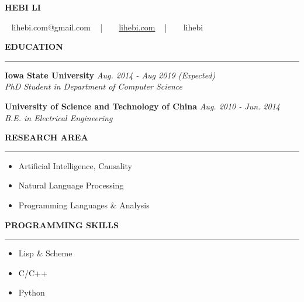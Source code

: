 \documentclass[10pt,letterpaper]{article}
\newenvironment{mysection}[1]{ %
  \medskip
  \MakeUppercase{\bf #1}
  \medskip
  \hrule
  \medskip
  \begin{list}{}{
      \setlength{\leftmargin}{1.5em}
    }
  \item[]
}{
  \end{list}
}
\begin{document}
\centerline{\MakeUppercase{\huge\bf Hebi Li}}
\medskip
\centerline{\faEnvelope ~ lihebi.com@gmail.com ~ | ~ \faHome ~
  \href{http://lihebi.com}{lihebi.com} ~ | ~ \faGithubSquare ~ lihebi
}

\begin{mysection}{Education}
  \textbf{Iowa State University} \hfill \emph{Aug. 2014 - Aug 2019 (Expected)} \\
  \emph{PhD Student in Department of Computer Science}

  \textbf{University of Science and Technology of China}
  \hfill \emph{Aug. 2010 - Jun. 2014} \\
  \emph{B.E. in Electrical Engineering}
\end{mysection}


\begin{minipage}{0.5\textwidth}
  \begin{mysection}{Research Area}
    \begin{itemize}
    \item Artificial Intelligence, Causality
    \item Natural Language Processing
    \item Programming Languages \& Analysis
    \end{itemize}
  \end{mysection}
\end{minipage}
\begin{minipage}{0.5\textwidth}
  \begin{mysection}{Programming Skills}
    \begin{itemize}
    \item Lisp \& Scheme
    \item C/C++
    \item Python
    \end{itemize}
  \end{mysection}
\end{minipage}
  
\end{document}

